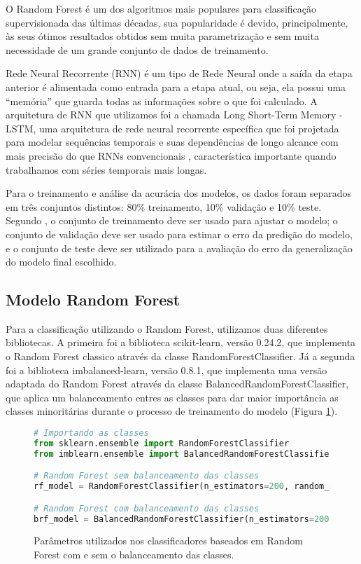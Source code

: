 O Random Forest é um dos algoritmos mais populares para classificação supervisionada  das últimas décadas, sua popularidade é devido, principalmente, às seus ótimos resultados obtidos sem muita parametrização e sem muita necessidade de um grande conjunto de dados de treinamento. 

Rede Neural Recorrente (RNN) é um tipo de Rede Neural onde a saída da etapa anterior é alimentada como entrada para a etapa atual, ou seja, ela possui uma “memória” que guarda todas as informações sobre o que foi calculado. A arquitetura de RNN que utilizamos foi a chamada Long Short-Term Memory - LSTM, uma arquitetura de rede neural recorrente específica que foi projetada para modelar sequências temporais e suas dependências de longo alcance com mais precisão do que RNNs convencionais \cite{sak2014long}, característica importante quando trabalhamos com séries temporais mais longas. 

Para o treinamento e análise da acurácia dos modelos, os dados foram separados em três conjuntos distintos: 80\% treinamento, 10\% validação e 10\% teste. Segundo , o conjunto de treinamento deve ser usado para ajustar o modelo; o conjunto de validação deve ser usado para estimar o erro da predição do modelo, e o conjunto de teste deve ser utilizado para a avaliação do erro da generalização do modelo final escolhido. 


\subsection{Modelo Random Forest}

Para a classificação utilizando o Random Forest, utilizamos duas diferentes bibliotecas. A primeira foi a biblioteca scikit-learn, versão 0.24.2, que implementa o Random Forest classico através da classe RandomForestClassifier. Já a segunda foi a biblioteca imbalanced-learn, versão 0.8.1, que implementa uma versão adaptada do Random Forest através da classe BalancedRandomForestClassifier, que aplica um balanceamento entres as classes para dar maior importância as classes minoritárias durante o processo de treinamento do modelo (Figura \ref{fig:parametros_random_forest}). 

\begin{figure}[H]
\centering
\caption{Parâmetros utilizados nos classificadores baseados em Random Forest com e sem o balanceamento das classes.}
\label{fig:parametros_random_forest}
\begin{lstlisting}[language=Python]
# Importando as classes
from sklearn.ensemble import RandomForestClassifier
from imblearn.ensemble import BalancedRandomForestClassifier

# Random Forest sem balanceamento das classes
rf_model = RandomForestClassifier(n_estimators=200, random_state=1, n_jobs=-1)

# Random Forest com balanceamento das classes
brf_model = BalancedRandomForestClassifier(n_estimators=200, random_state=1, n_jobs=-1)

\end{lstlisting}
\end{figure}

